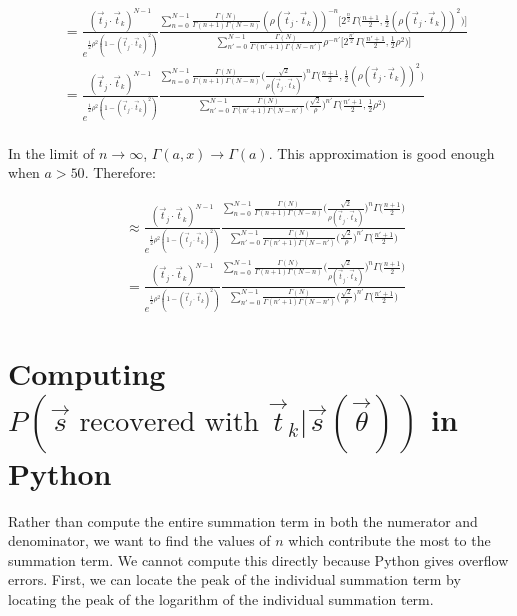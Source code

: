 \documentclass[12pt]{article}
\newcommand{\ptjtk}{\rho(\vec{t}_j\cdot\vec{t}_k)}
\newcommand{\tjtk}{(\vec{t}_j\cdot\vec{t}_k)}
\begin{document}
   \begin{align}
   &= \frac{\tjtk^{N-1}}{e^{\frac{1}{2}\rho^2(1-\tjtk^2)}} \frac{ \sum_{n=0}^{N-1} \frac{\Gamma(N)}{\Gamma(n+1)\Gamma(N-n)} (\ptjtk)^{-n} \Big[ 2^{\frac{n}{2}}\Gamma\Big(\frac{n+1}{2},\frac{1}{2}(\ptjtk)^2\Big) \Big]} 
   { \sum_{n'=0}^{N-1} \frac{\Gamma(N)}{\Gamma(n'+1)\Gamma(N-n')} \rho^{-n'}  \Big[ 2^{\frac{n'}{2}}\Gamma\Big(\frac{n'+1}{2},\frac{1}{2}\rho^2\Big) \Big] } \\
   &= \frac{\tjtk^{N-1}}{e^{\frac{1}{2}\rho^2(1-\tjtk^2)}} \frac{ \sum_{n=0}^{N-1} \frac{\Gamma(N)}{\Gamma(n+1)\Gamma(N-n)} \Big(\frac{\sqrt{2}}{\ptjtk}\Big)^{n} \Gamma\Big(\frac{n+1}{2},\frac{1}{2}(\ptjtk)^2\Big) } 
   { \sum_{n'=0}^{N-1} \frac{\Gamma(N)}{\Gamma(n'+1)\Gamma(N-n')} \Big(\frac{\sqrt{2}}{\rho}\Big)^{n'} \Gamma\Big(\frac{n'+1}{2},\frac{1}{2}\rho^2\Big) } \\
   \end{align}
  
In the limit of $n \rightarrow \infty$, $\Gamma(a,x) \rightarrow \Gamma(a)$. This approximation is good enough when $a > 50$. Therefore:
   
   \begin{align}
   &\approx \frac{\tjtk^{N-1}}{e^{\frac{1}{2}\rho^2(1-\tjtk^2)}} \frac{ \sum_{n=0}^{N-1} \frac{\Gamma(N)}{\Gamma(n+1)\Gamma(N-n)} \Big(\frac{\sqrt{2}}{\ptjtk}\Big)^{n} \Gamma\Big(\frac{n+1}{2}\Big) } 
   { \sum_{n'=0}^{N-1} \frac{\Gamma(N)}{\Gamma(n'+1)\Gamma(N-n')} \Big(\frac{\sqrt{2}}{\rho}\Big)^{n'} \Gamma\Big(\frac{n'+1}{2}\Big) } \\
   &= \frac{\tjtk^{N-1}}{e^{\frac{1}{2}\rho^2(1-\tjtk^2)}} \frac{ \sum_{n=0}^{N-1} \frac{\Gamma(N)}{\Gamma(n+1)\Gamma(N-n)} \Big(\frac{\sqrt{2}}{\ptjtk}\Big)^{n} \Gamma\Big(\frac{n+1}{2}\Big) } 
   { \sum_{n'=0}^{N-1} \frac{\Gamma(N)}{\Gamma(n'+1)\Gamma(N-n')} \Big(\frac{\sqrt{2}}{\rho}\Big)^{n'} \Gamma\Big(\frac{n'+1}{2}\Big) }
   \label{eqn: finalGammaeqn}
   \end{align}
   
\section{Computing $P(\text{$\vec{s}$ recovered with $\vec{t}_k$}|\vec{s}(\vec\theta))$ in Python}
   
Rather than compute the entire summation term in both the numerator and denominator, we want to find the values of $n$ which contribute the most to the summation term. We cannot compute this directly because Python gives overflow errors. First, we can locate the peak of the individual summation term by locating the peak of the logarithm of the individual summation term.
\end{document}
